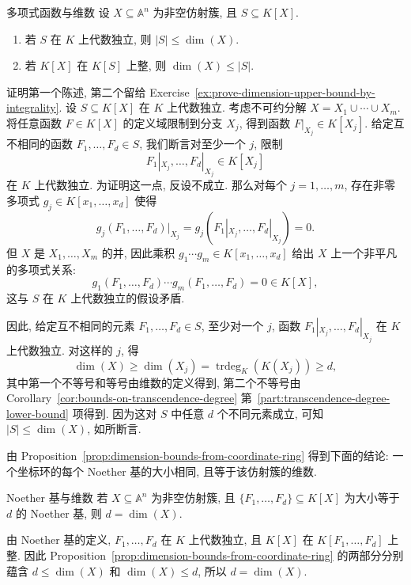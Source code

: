 \begin{Proposition}{多项式函数与维数}\leavevmode\label{prop:dimension-bounds-from-coordinate-ring}
设 $X\subseteq\mathbb{A}^{n}$ 为非空仿射簇, 且 $S\subseteq K[X]$.
\begin{enumerate}
  \item\label{part:coordinate-ring-dimension-lower-bound} 若 $S$ 在 $K$ 上代数独立, 则 $|S|\leq\dim(X)$.
  \item\label{part:coordinate-ring-dimension-upper-bound} 若 $K[X]$ 在 $K[S]$ 上整, 则 $\dim(X)\leq|S|$.
\end{enumerate}
\end{Proposition}
\begin{Proof}
证明第一个陈述, 第二个留给 Exercise~\ref{ex:prove-dimension-upper-bound-by-integrality}. 设 $S\subseteq K[X]$ 在 $K$ 上代数独立. 考虑不可约分解 $X=X_{1}\cup\cdots\cup X_{m}$. 将任意函数 $F\in K[X]$ 的定义域限制到分支 $X_{j}$, 得到函数 $F|_{X_{j}}\in K[X_{j}]$. 给定互不相同的函数 $F_{1},\ldots,F_{d}\in S$, 我们断言对至少一个 $j$, 限制
\[
  F_{1}|_{X_{j}},\ldots,F_{d}|_{X_{j}}\in K[X_{j}]
\]
在 $K$ 上代数独立. 为证明这一点, 反设不成立. 那么对每个 $j=1,\ldots,m$, 存在非零多项式 $g_{j}\in K[x_{1},\ldots,x_{d}]$ 使得
\[
  g_{j}(F_{1},\ldots,F_{d})|_{X_{j}}
    =g_{j}(F_{1}|_{X_{j}},\ldots,F_{d}|_{X_{j}})=0.
\]
但 $X$ 是 $X_{1},\ldots,X_{m}$ 的并, 因此乘积 $g_{1}\cdots g_{m}\in K[x_{1},\ldots,x_{d}]$ 给出 $X$ 上一个非平凡的多项式关系:
\[
  g_{1}(F_{1},\ldots,F_{d})\cdots g_{m}(F_{1},\ldots,F_{d})=0\in K[X],
\]
这与 $S$ 在 $K$ 上代数独立的假设矛盾.

因此, 给定互不相同的元素 $F_{1},\ldots,F_{d}\in S$, 至少对一个 $j$, 函数 $F_{1}|_{X_{j}},\ldots,F_{d}|_{X_{j}}$ 在 $K$ 上代数独立. 对这样的 $j$, 得
\[
  \dim(X)\geq\dim(X_{j})=\operatorname{trdeg}_{K}(K(X_{j}))\geq d,
\]
其中第一个不等号和等号由维数的定义得到, 第二个不等号由 Corollary~\ref{cor:bounds-on-transcendence-degree} 第~\ref{part:transcendence-degree-lower-bound} 项得到. 因为这对 $S$ 中任意 $d$ 个不同元素成立, 可知 $|S|\leq\dim(X)$, 如所断言.
\end{Proof}

由 Proposition~\ref{prop:dimension-bounds-from-coordinate-ring} 得到下面的结论: 一个坐标环的每个 Noether 基的大小相同, 且等于该仿射簇的维数.

\begin{Corollary}{Noether 基与维数}\leavevmode\label{cor:noether-basis-counts-dimension}
若 $X\subseteq\mathbb{A}^{n}$ 为非空仿射簇, 且 $\{F_{1},\ldots,F_{d}\}\subseteq K[X]$ 为大小等于 $d$ 的 Noether 基, 则 $d=\dim(X)$.
\end{Corollary}
\begin{Proof}
由 Noether 基的定义, $F_{1},\ldots,F_{d}$ 在 $K$ 上代数独立, 且 $K[X]$ 在 $K[F_{1},\ldots,F_{d}]$ 上整. 因此 Proposition~\ref{prop:dimension-bounds-from-coordinate-ring} 的两部分分别蕴含 $d\leq\dim(X)$ 和 $\dim(X)\leq d$, 所以 $d=\dim(X)$.
\end{Proof}

